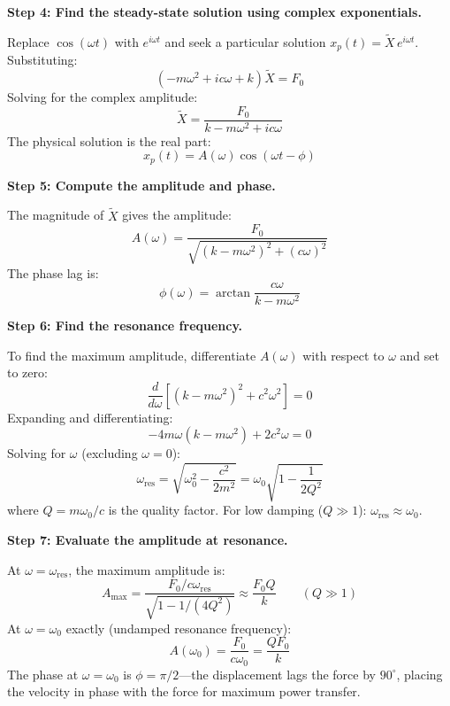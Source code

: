 \textbf{Step 4: Find the steady-state solution using complex exponentials.}

Replace $\cos(\omega t)$ with $e^{i\omega t}$ and seek a particular solution $x_p(t) = \tilde{X}\,e^{i\omega t}$. Substituting:
\begin{equation}
(-m\omega^2 + ic\omega + k)\tilde{X} = F_0
\end{equation}
Solving for the complex amplitude:
\begin{equation}
\tilde{X} = \frac{F_0}{k - m\omega^2 + ic\omega}
\end{equation}
The physical solution is the real part:
\begin{equation}
x_p(t) = A(\omega)\cos(\omega t - \phi)
\end{equation}

\textbf{Step 5: Compute the amplitude and phase.}

The magnitude of $\tilde{X}$ gives the amplitude:
\begin{equation}
A(\omega) = \frac{F_0}{\sqrt{(k - m\omega^2)^2 + (c\omega)^2}}
\end{equation}
The phase lag is:
\begin{equation}
\phi(\omega) = \arctan\frac{c\omega}{k - m\omega^2}
\end{equation}

\textbf{Step 6: Find the resonance frequency.}

To find the maximum amplitude, differentiate $A(\omega)$ with respect to $\omega$ and set to zero:
\begin{equation}
\frac{d}{d\omega}\left[(k - m\omega^2)^2 + c^2\omega^2\right] = 0
\end{equation}
Expanding and differentiating:
\begin{equation}
-4m\omega(k - m\omega^2) + 2c^2\omega = 0
\end{equation}
Solving for $\omega$ (excluding $\omega = 0$):
\begin{equation}
\omega_{\text{res}} = \sqrt{\omega_0^2 - \frac{c^2}{2m^2}} = \omega_0\sqrt{1 - \frac{1}{2Q^2}}
\end{equation}
where $Q = m\omega_0/c$ is the quality factor. For low damping ($Q \gg 1$): $\omega_{\text{res}} \approx \omega_0$.

\textbf{Step 7: Evaluate the amplitude at resonance.}

At $\omega = \omega_{\text{res}}$, the maximum amplitude is:
\begin{equation}
A_{\text{max}} = \frac{F_0/c\omega_{\text{res}}}{\sqrt{1 - 1/(4Q^2)}} \approx \frac{F_0 Q}{k} \qquad (Q \gg 1)
\end{equation}
At $\omega = \omega_0$ exactly (undamped resonance frequency):
\begin{equation}
A(\omega_0) = \frac{F_0}{c\omega_0} = \frac{QF_0}{k}
\end{equation}
The phase at $\omega = \omega_0$ is $\phi = \pi/2$---the displacement lags the force by $90^\circ$, placing the velocity in phase with the force for maximum power transfer.

